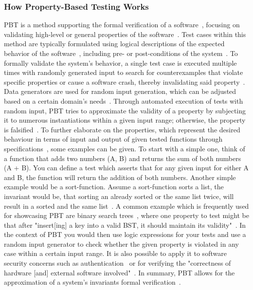 \documentclass[runningheads]{llncs}
\begin{document}
\subsubsection{How Property-Based Testing Works}
PBT is a method supporting the formal verification of a software~\cite{Chen2022,Fink1997,Honarvar2020,Paraskevopoulou2015}, focusing on validating high-level or general properties of the software~\cite{Fink1997,Loescher2017,Honarvar2020,Corgozinho2023}. Test cases within this method are typically formulated using logical descriptions of the expected behavior of the software~\cite{Chen2022,Fink1997,Honarvar2020,Loescher2017,Corgozinho2023}, including pre- or post-conditions of the system~\cite{Honarvar2020}. To formally validate the system's behavior, a single test case is executed multiple times with randomly generated input to search for counterexamples that violate specific properties or cause a software crash, thereby invalidating said property~\cite{Chen2022,Loescher2017,Padhye2019,ElazarMittelman2023,Paraskevopoulou2015,Corgozinho2023}. Data generators are used for random input generation, which can be adjusted based on a certain domain's needs~\cite{Chen2022,Loescher2017,Padhye2019,ElazarMittelman2023}. Through automated execution of tests with random input, PBT tries to approximate the validity of a property by subjecting it to numerous instantiations within a given input range; otherwise, the property is falsified~\cite{Fink1997,ElazarMittelman2023,Corgozinho2023,Paraskevopoulou2015}. To further elaborate on the properties, which represent the desired behaviour in terms of input and output of given tested functions through specifications~\cite{Chen2022,Fink1997,Loescher2017}, some examples can be given. To start with a simple one, think of a function that adds two numbers (A, B) and returns the sum of both numbers (A + B). You can define a test which asserts that for any given input for either A and B, the function will return the addition of both numbers. Another simple example would be a sort-function. Assume a sort-function sorts a list, the invariant would be, that sorting an already sorted or the same list twice, will result in a sorted and the same list~\cite{Corgozinho2023}. A common example which is frequently used for showcasing PBT are binary search trees~\cite{Corgozinho2023,Shi2023}, where one property to test might be that after "insert[ing] a key into a valid BST, it should maintain its validity"~\cite{Shi2023}. In the context of PBT you would then use logic expressions for your tests and use a random input generator to check whether the given property is violated in any case within a certain input range. It is also possible to apply it to software security concerns such as authentication~\cite{Fink1997} or for verifying the "correctness of hardware [and] external software involved"~\cite{Chen2022}. In summary, PBT allows for the approximation of a system's invariants formal verification~\cite{Fink1997,ElazarMittelman2023,Corgozinho2023}.
\end{document}
